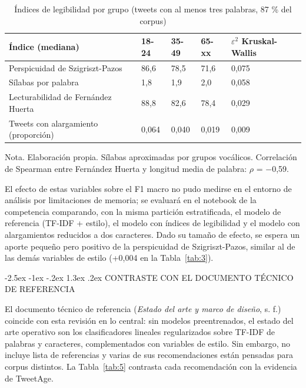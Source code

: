 \documentclass[10pt,twocolumn]{article}
\makeatletter
\renewcommand{\section}{\@startsection{section}{1}{\z@}%
  {-2.5ex \@plus -1ex \@minus -.2ex}%
  {1.3ex \@plus .2ex}%
  {\normalfont\large\bfseries\centering}}
\makeatother
\begin{document}
\begin{table}[!t]
\centering\footnotesize
\caption{Índices de legibilidad por grupo (tweets con al menos tres palabras, 87 \% del corpus)}\label{tab:4}
\renewcommand{\arraystretch}{1.15}
\begin{tabular}{p{}p{}p{}p{}p{}}
\hline
\raggedright\textbf{Índice (mediana)} & \raggedright\textbf{18-24} & \raggedright\textbf{35-49} & \raggedright\textbf{65-xx} & \raggedright\textbf{$\varepsilon^2$ Kruskal-Wallis} \tabularnewline \hline
\raggedright Perspicuidad de Szigriszt-Pazos & \raggedright 86,6 & \raggedright 78,5 & \raggedright 71,6 & \raggedright 0,075 \tabularnewline
\raggedright Sílabas por palabra & \raggedright 1,8 & \raggedright 1,9 & \raggedright 2,0 & \raggedright 0,058 \tabularnewline
\raggedright Lecturabilidad de Fernández Huerta & \raggedright 88,8 & \raggedright 82,6 & \raggedright 78,4 & \raggedright 0,029 \tabularnewline
\raggedright Tweets con alargamiento (proporción) & \raggedright 0,064 & \raggedright 0,040 & \raggedright 0,019 & \raggedright 0,009 \tabularnewline
\hline
\end{tabular}
\par\smallskip\raggedright\scriptsize Nota. Elaboración propia. Sílabas aproximadas por grupos vocálicos. Correlación de Spearman entre Fernández Huerta y longitud media de palabra: $\rho$ = $-$0,59.
\end{table}

El efecto de estas variables sobre el F1 macro no pudo medirse en el entorno de análisis por limitaciones de memoria; se evaluará en el notebook de la competencia comparando, con la misma partición estratificada, el modelo de referencia (TF-IDF + estilo), el modelo con índices de legibilidad y el modelo con alargamientos reducidos a dos caracteres. Dado su tamaño de efecto, se espera un aporte pequeño pero positivo de la perspicuidad de Szigriszt-Pazos, similar al de las demás variables de estilo (+0,004 en la Tabla~\ref{tab:3}).


\section{CONTRASTE CON EL DOCUMENTO TÉCNICO DE REFERENCIA}\label{sec:9}

El documento técnico de referencia (\textit{Estado del arte y marco de diseño}, s. f.) coincide con esta revisión en lo central: sin modelos preentrenados, el estado del arte operativo son los clasificadores lineales regularizados sobre TF-IDF de palabras y caracteres, complementados con variables de estilo. Sin embargo, no incluye lista de referencias y varias de sus recomendaciones están pensadas para corpus distintos. La Tabla~\ref{tab:5} contrasta cada recomendación con la evidencia de TweetAge.
\end{document}
